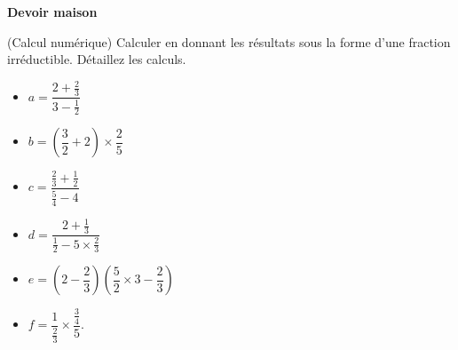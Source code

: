 \documentclass[12pt,
addpoints,
fleqn
]{exam}
\begin{document}
\begin{center}
    {\huge\bfseries Devoir maison }
    \par\bigskip
\end{center}

\begin{questions}

    \question (Calcul numérique) Calculer en donnant les résultats sous la forme d'une fraction irréductible. Détaillez les calculs.
    \begin{multicols}{3}
        \begin{itemize}
            \item[] $a= \dfrac{2+\frac{2}{3}}{3-\frac{1}{2}}$ \\
            \item[] $b=\left( \dfrac{3}{2}+2\right)\times \dfrac{2}{5}$ \\
            \item[] $c=\dfrac{\frac{2}{3}+\frac{1}{2}}{\frac{5}{4}-4}$ \\
            \item[] $d=\dfrac{2+\frac{1}{3}}{\frac{1}{2}-5\times\frac{2}{3}}$ \\
            \item[] $ e=\left(2 - \dfrac{2}{3}\right)\left(\dfrac{5}{2}\times 3 - \dfrac{2}{3}\right)$
            \item[] $f=\dfrac{1}{\frac{2}{3}}\times\dfrac{\frac{3}{4}}{5}.$
        \end{itemize}
    \end{multicols}


\end{questions}
\end{document}
